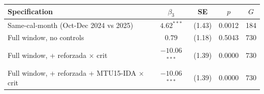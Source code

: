 \begin{tabular}{l c c c c}
\toprule
Specification & $\beta_3$ & SE & $p$ & $G$ \\
\midrule
Same-cal-month (Oct-Dec 2024 vs 2025) & $4.62$$^{***}$ & (1.43) & 0.0012 & 184 \\
Full window, no controls & $0.79$ & (1.18) & 0.5043 & 730 \\
Full window, + reforzada $\times$ crit & $-10.06$$^{***}$ & (1.39) & 0.0000 & 730 \\
Full window, + reforzada + MTU15-IDA $\times$ crit & $-10.06$$^{***}$ & (1.39) & 0.0000 & 730 \\
\bottomrule
\end{tabular}